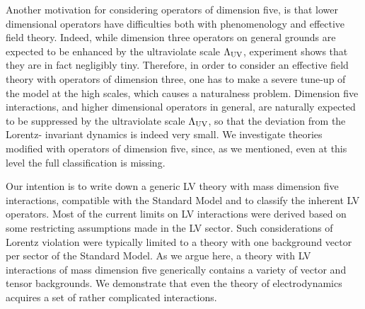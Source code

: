 \documentclass[12pt]{revtex4}
\begin{document}
	Another motivation for considering operators of dimension five,
	is that lower dimensional operators have difficulties both with
	phenomenology and effective field theory.
	Indeed, while dimension three operators on general grounds are
	expected to be enhanced by the ultraviolate scale 
$ \Lambda_{\rm UV} $,
	experiment shows that they are in fact negligibly tiny.
	Therefore, in order to consider an effective field theory with
	operators of dimension three, one has to make a severe tune-up
	of the model at the high scales, which causes a naturalness problem.
	Dimension five interactions, and higher dimensional operators in
	general, are naturally expected to be suppressed by the ultraviolate
	scale $ \Lambda_{\rm UV} $, so that the deviation from the Lorentz-
	invariant dynamics is indeed very small.
	We investigate theories modified with operators of 
	dimension five, since, as we mentioned, even at this level the
	full classification is missing.

	Our intention is to write down a generic LV theory with mass dimension
	five interactions, compatible with the Standard Model and to classify
	the inherent LV operators. 
%
	Most of the current limits on LV interactions were derived based on some
	restricting assumptions made in the LV sector.
	Such considerations of Lorentz violation were typically limited to a theory with
	one background vector per sector of the Standard Model.
	As we argue here, a theory with LV interactions of mass
	dimension five generically contains a variety of vector and tensor 
	backgrounds.
	We demonstrate that even the theory of electrodynamics acquires a set
	of rather complicated interactions. 
\end{document}
